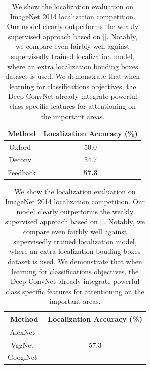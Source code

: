 \begin{table}
\centering
\begin{tabular}{|c|c|}
\hline
Method & Localization Accuracy (\%) \\
\hline
Oxford~\cite{simonyan2013deep} & 50.0 \\
Deconv~\cite{zeiler2014visualizing} & 54.7 \\
Feedback & \textbf{57.3} \\
\hline
\end{tabular}
\caption{We show the localization evaluation on ImageNet 2014 localization competition. Our model clearly outperforms the weakly supervised approach based on []. Notably, we compare even fairbly well against supervisedly trained localization model, where an extra localization bouding boxes dataset is used. We demonstrate that when learning for classifications objectives, the Deep ConvNet already integrate powerful class specific features for attentioning on the important areas.}
\label{tab:localization_accuracy}
\end{table}

\begin{table}
\centering
\begin{tabular}{|c|c|}
\hline
Method & Localization Accuracy (\%) \\ 
\hline
AlexNet~\cite{Krizhevsky2012ImageNet} & \\
VggNet~\cite{Simonyan2014Very} & 57.3 \\
GooglNet~\cite{Szegedy2014Going} & \\
\hline
\end{tabular}
\caption{We show the localization evaluation on ImageNet 2014 localization competition. Our model clearly outperforms the weakly supervised approach based on []. Notably, we compare even fairbly well against supervisedly trained localization model, where an extra localization bouding boxes dataset is used. We demonstrate that when learning for classifications objectives, the Deep ConvNet already integrate powerful class specific features for attentioning on the important areas.}
\label{tab:localization_model_compare}
\end{table}

